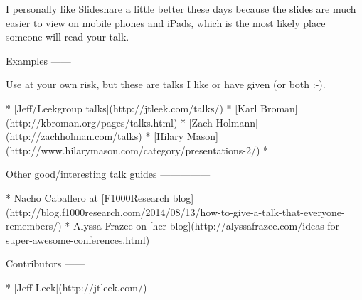 \documentclass[12pt]{article}
\begin{document}
I personally like Slideshare a little better these days because the slides are much easier to view on mobile phones and iPads, which is the most likely place someone will read your talk. 


Examples
------

Use at your own risk, but these are talks I like or have given (or both :-). 

* [Jeff/Leekgroup talks](http://jtleek.com/talks/)
* [Karl Broman](http://kbroman.org/pages/talks.html)
* [Zach Holmann](http://zachholman.com/talks)
* [Hilary Mason](http://www.hilarymason.com/category/presentations-2/)
* 


Other good/interesting talk guides
---------------

* Nacho Caballero at [F1000Research blog](http://blog.f1000research.com/2014/08/13/how-to-give-a-talk-that-everyone-remembers/)
* Alyssa Frazee on [her blog](http://alyssafrazee.com/ideas-for-super-awesome-conferences.html) 


Contributors
------

* [Jeff Leek](http://jtleek.com/)
\end{document}
